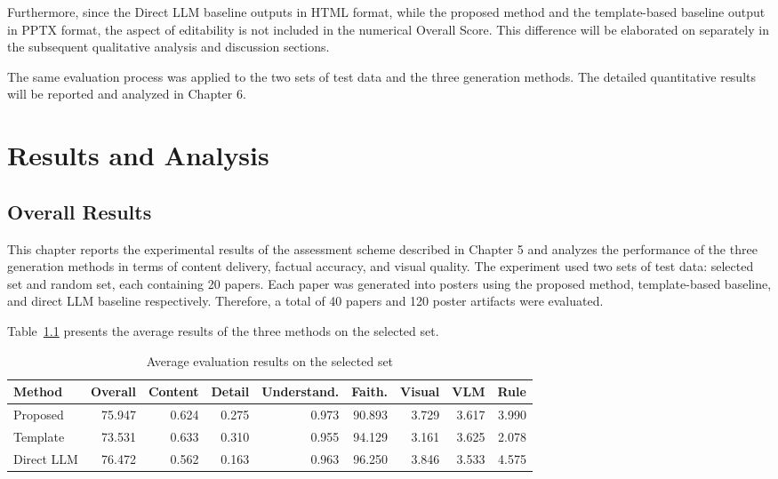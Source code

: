 \documentclass[12pt,oneside]{report}
\begin{document}
Furthermore, since the Direct LLM baseline outputs in HTML format, while the proposed method and the template-based baseline output in PPTX format, the aspect of editability is not included in the numerical Overall Score. This difference will be elaborated on separately in the subsequent qualitative analysis and discussion sections.

\vspace{1em}

The same evaluation process was applied to the two sets of test data and the three generation methods. The detailed quantitative results will be reported and analyzed in Chapter 6.




\chapter{Results and Analysis}

\section{Overall Results}

This chapter reports the experimental results of the assessment scheme described in Chapter 5 and analyzes the performance of the three generation methods in terms of content delivery, factual accuracy, and visual quality. The experiment used two sets of test data: selected set and random set, each containing 20 papers. Each paper was generated into posters using the proposed method, template-based baseline, and direct LLM baseline respectively. Therefore, a total of 40 papers and 120 poster artifacts were evaluated.

\vspace{1em}

Table~\ref{tab:selected_results} presents the average results of the three methods on the selected set.

\begin{table}[H]
\centering
\small
\setlength{\tabcolsep}{4pt}
\renewcommand{\arraystretch}{1.2}
\caption{Average evaluation results on the selected set}
\label{tab:selected_results}

\begin{tabularx}{\textwidth}{lrrrrrrrr}
\toprule
\textbf{Method} &
\textbf{Overall} &
\textbf{Content} &
\textbf{Detail} &
\textbf{Understand.} &
\textbf{Faith.} &
\textbf{Visual} &
\textbf{VLM} &
\textbf{Rule} \\
\midrule
Proposed & 75.947 & 0.624 & 0.275 & 0.973 & 90.893 & 3.729 & 3.617 & 3.990 \\
Template & 73.531 & 0.633 & 0.310 & 0.955 & 94.129 & 3.161 & 3.625 & 2.078 \\
Direct LLM & 76.472 & 0.562 & 0.163 & 0.963 & 96.250 & 3.846 & 3.533 & 4.575 \\
\bottomrule
\end{tabularx}
\end{table}
\end{document}
